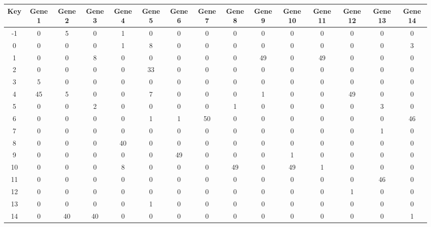 \begin{tabular}{|c|c|c|c|c|c|c|c|c|c|c|c|c|c|c|}
\hline
Key & Gene 1 & Gene 2 & Gene 3 & Gene 4 & Gene 5 & Gene 6 & Gene 7 & Gene 8 & Gene 9 & Gene 10 & Gene 11 & Gene 12 & Gene 13 & Gene 14 \\
\hline
-1 & 0 & 5 & 0 & 1 & 0 & 0 & 0 & 0 & 0 & 0 & 0 & 0 & 0 & 0 \\
0 & 0 & 0 & 0 & 1 & 8 & 0 & 0 & 0 & 0 & 0 & 0 & 0 & 0 & 3 \\
1 & 0 & 0 & 8 & 0 & 0 & 0 & 0 & 0 & 49 & 0 & 49 & 0 & 0 & 0 \\
2 & 0 & 0 & 0 & 0 & 33 & 0 & 0 & 0 & 0 & 0 & 0 & 0 & 0 & 0 \\
3 & 5 & 0 & 0 & 0 & 0 & 0 & 0 & 0 & 0 & 0 & 0 & 0 & 0 & 0 \\
4 & 45 & 5 & 0 & 0 & 7 & 0 & 0 & 0 & 1 & 0 & 0 & 49 & 0 & 0 \\
5 & 0 & 0 & 2 & 0 & 0 & 0 & 0 & 1 & 0 & 0 & 0 & 0 & 3 & 0 \\
6 & 0 & 0 & 0 & 0 & 1 & 1 & 50 & 0 & 0 & 0 & 0 & 0 & 0 & 46 \\
7 & 0 & 0 & 0 & 0 & 0 & 0 & 0 & 0 & 0 & 0 & 0 & 0 & 1 & 0 \\
8 & 0 & 0 & 0 & 40 & 0 & 0 & 0 & 0 & 0 & 0 & 0 & 0 & 0 & 0 \\
9 & 0 & 0 & 0 & 0 & 0 & 49 & 0 & 0 & 0 & 1 & 0 & 0 & 0 & 0 \\
10 & 0 & 0 & 0 & 8 & 0 & 0 & 0 & 49 & 0 & 49 & 1 & 0 & 0 & 0 \\
11 & 0 & 0 & 0 & 0 & 0 & 0 & 0 & 0 & 0 & 0 & 0 & 0 & 46 & 0 \\
12 & 0 & 0 & 0 & 0 & 0 & 0 & 0 & 0 & 0 & 0 & 0 & 1 & 0 & 0 \\
13 & 0 & 0 & 0 & 0 & 1 & 0 & 0 & 0 & 0 & 0 & 0 & 0 & 0 & 0 \\
14 & 0 & 40 & 40 & 0 & 0 & 0 & 0 & 0 & 0 & 0 & 0 & 0 & 0 & 1 \\
\hline
\end{tabular}
